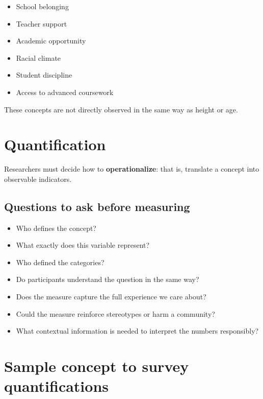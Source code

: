 \documentclass[
  letterpaper,
  DIV=11,
  numbers=noendperiod]{scrartcl}
\providecommand{\tightlist}{%
  \setlength{\itemsep}{0pt}\setlength{\parskip}{0pt}}\usepackage{longtable,booktabs,array}
\begin{document}
\begin{itemize}
\tightlist
\item
  School belonging
\item
  Teacher support
\item
  Academic opportunity
\item
  Racial climate
\item
  Student discipline
\item
  Access to advanced coursework
\end{itemize}

These concepts are not directly observed in the same way as height or
age.

\section{Quantification}\label{quantification-2}

Researchers must decide how to \textbf{operationalize}: that is,
translate a concept into observable indicators.

\subsection{Questions to ask before
measuring}\label{questions-to-ask-before-measuring}

\begin{itemize}
\tightlist
\item
  Who defines the concept?
\item
  What exactly does this variable represent?
\item
  Who defined the categories?
\item
  Do participants understand the question in the same way?
\item
  Does the measure capture the full experience we care about?
\item
  Could the measure reinforce stereotypes or harm a community?
\item
  What contextual information is needed to interpret the numbers
  responsibly?
\end{itemize}

\section{Sample concept to survey
quantifications}\label{sample-concept-to-survey-quantifications}
\end{document}
